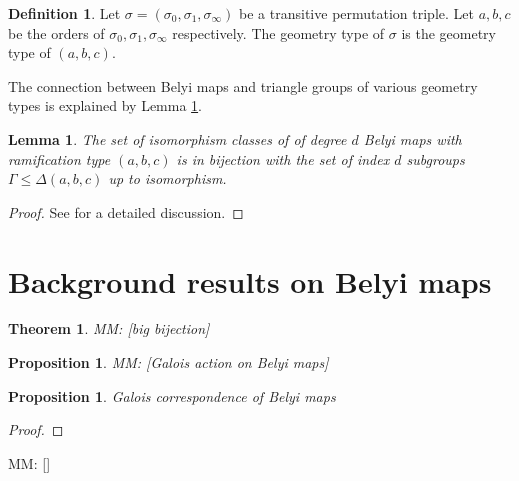 \documentclass{dcthesis}
\newcommand{\defi}[1]{\textsf{#1}}
\newcommand{\mm}[1]{{\color{blue} \sf MM: [#1]}}
\numberwithin{equation}{section}
\newtheorem{theorem}[equation]{Theorem}
\newtheorem{prop}[equation]{Proposition}
\newtheorem{lemma}[equation]{Lemma}
\theoremstyle{definition}
\newtheorem{definition}[equation]{Definition}
\theoremstyle{remark}
\begin{document}
{{\begin{definition}
      Let $\sigma=(\sigma_0,\sigma_1,\sigma_\infty)$ be a transitive permutation triple.
      Let $a,b,c$ be the orders of
      $\sigma_0,\sigma_1,\sigma_\infty$ respectively.
      The \defi{geometry type} of $\sigma$
      is the geometry type of $(a,b,c)$.
    \end{definition}
    The connection between Belyi maps and triangle groups
    of various geometry types is explained by Lemma
    \ref{lem:belyimapsandtrianglegroups}.
    \begin{lemma}
      \label{lem:belyimapsandtrianglegroups}
      The set of isomorphism classes of of degree $d$
      Belyi maps with ramification type $(a,b,c)$
      is in bijection with the set of
      index $d$ subgroups
      $\Gamma\leq\Delta(a,b,c)$
      up to isomorphism.
    \end{lemma}
    \begin{proof}
      See \cite{KMSV} for a detailed discussion.
    \end{proof}
  }
  \section{Background results on Belyi maps}{\label{sec:backgroundresults}
    \begin{theorem}\label{thm:bigbijection}
      \mm{big bijection}
    \end{theorem}
    \begin{prop}\label{prop:galoisaction}
      \mm{Galois action on Belyi maps}
    \end{prop}
    \begin{prop}\label{prop:galoiscorrespondence}
      Galois correspondence of Belyi maps
    \end{prop}
    \begin{proof}
    \end{proof}
    \mm{\cite[1.6, 1.7]{SV}}
  }
}
\end{document}
